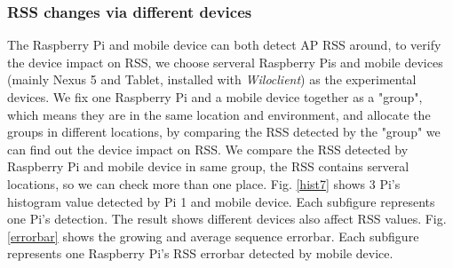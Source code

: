 \documentclass[10pt,conference]{IEEEtran}
\begin{document}

\subsubsection{RSS changes via different devices}
The Raspberry Pi and mobile device can both detect AP RSS around, to verify the device impact on RSS, we choose serveral Raspberry Pis and mobile devices (mainly Nexus 5 and Tablet, installed with \textit{Wiloclient}) as the experimental devices. We fix one Raspberry Pi and a mobile device together as a "group", which means they are in the same location and environment, and allocate the groups in different locations, by comparing the RSS detected by the "group" we can find out the device impact on RSS. We compare the RSS detected by Raspberry Pi and mobile device in same group, the RSS contains serveral locations, so we can check more than one place.
Fig. \ref{hist7} shows 3 Pi's histogram value detected by Pi 1 and mobile device. Each subfigure represents one Pi's detection. The result shows different devices also affect RSS values.
Fig. \ref{errorbar} shows the growing and average sequence errorbar. Each subfigure represents one Raspberry Pi's RSS errorbar detected by mobile device.
\end{document}
